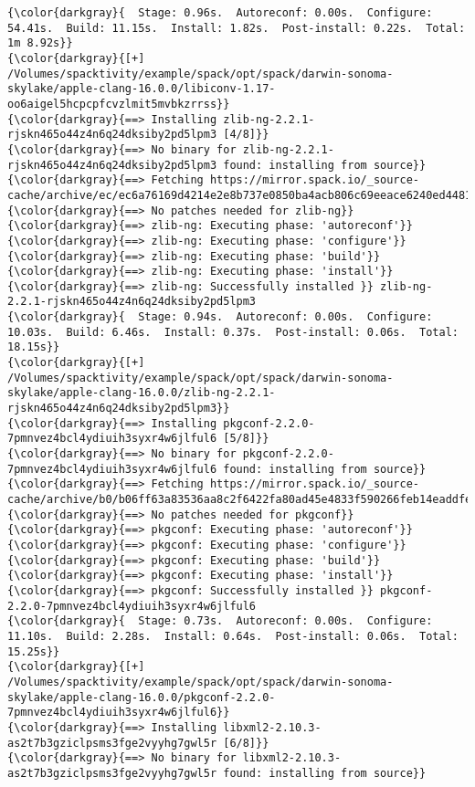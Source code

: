 \documentclass[10pt, oneside]{article}   	%
\begin{document}
{{\begin{Verbatim}[commandchars=\\\{\}]
{\color{darkgray}{  Stage: 0.96s.  Autoreconf: 0.00s.  Configure: 54.41s.  Build: 11.15s.  Install: 1.82s.  Post-install: 0.22s.  Total: 1m 8.92s}}
{\color{darkgray}{[+] /Volumes/spacktivity/example/spack/opt/spack/darwin-sonoma-skylake/apple-clang-16.0.0/libiconv-1.17-oo6aigel5hcpcpfcvzlmit5mvbkzrrss}}
{\color{darkgray}{==> Installing zlib-ng-2.2.1-rjskn465o44z4n6q24dksiby2pd5lpm3 [4/8]}}
{\color{darkgray}{==> No binary for zlib-ng-2.2.1-rjskn465o44z4n6q24dksiby2pd5lpm3 found: installing from source}}
{\color{darkgray}{==> Fetching https://mirror.spack.io/_source-cache/archive/ec/ec6a76169d4214e2e8b737e0850ba4acb806c69eeace6240ed4481b9f5c57cdf.tar.gz}}
{\color{darkgray}{==> No patches needed for zlib-ng}}
{\color{darkgray}{==> zlib-ng: Executing phase: 'autoreconf'}}
{\color{darkgray}{==> zlib-ng: Executing phase: 'configure'}}
{\color{darkgray}{==> zlib-ng: Executing phase: 'build'}}
{\color{darkgray}{==> zlib-ng: Executing phase: 'install'}}
{\color{darkgray}{==> zlib-ng: Successfully installed }} zlib-ng-2.2.1-rjskn465o44z4n6q24dksiby2pd5lpm3
{\color{darkgray}{  Stage: 0.94s.  Autoreconf: 0.00s.  Configure: 10.03s.  Build: 6.46s.  Install: 0.37s.  Post-install: 0.06s.  Total: 18.15s}}
{\color{darkgray}{[+] /Volumes/spacktivity/example/spack/opt/spack/darwin-sonoma-skylake/apple-clang-16.0.0/zlib-ng-2.2.1-rjskn465o44z4n6q24dksiby2pd5lpm3}}
{\color{darkgray}{==> Installing pkgconf-2.2.0-7pmnvez4bcl4ydiuih3syxr4w6jlful6 [5/8]}}
{\color{darkgray}{==> No binary for pkgconf-2.2.0-7pmnvez4bcl4ydiuih3syxr4w6jlful6 found: installing from source}}
{\color{darkgray}{==> Fetching https://mirror.spack.io/_source-cache/archive/b0/b06ff63a83536aa8c2f6422fa80ad45e4833f590266feb14eaddfe1d4c853c69.tar.xz}}
{\color{darkgray}{==> No patches needed for pkgconf}}
{\color{darkgray}{==> pkgconf: Executing phase: 'autoreconf'}}
{\color{darkgray}{==> pkgconf: Executing phase: 'configure'}}
{\color{darkgray}{==> pkgconf: Executing phase: 'build'}}
{\color{darkgray}{==> pkgconf: Executing phase: 'install'}}
{\color{darkgray}{==> pkgconf: Successfully installed }} pkgconf-2.2.0-7pmnvez4bcl4ydiuih3syxr4w6jlful6
{\color{darkgray}{  Stage: 0.73s.  Autoreconf: 0.00s.  Configure: 11.10s.  Build: 2.28s.  Install: 0.64s.  Post-install: 0.06s.  Total: 15.25s}}
{\color{darkgray}{[+] /Volumes/spacktivity/example/spack/opt/spack/darwin-sonoma-skylake/apple-clang-16.0.0/pkgconf-2.2.0-7pmnvez4bcl4ydiuih3syxr4w6jlful6}}
{\color{darkgray}{==> Installing libxml2-2.10.3-as2t7b3gziclpsms3fge2vyyhg7gwl5r [6/8]}}
{\color{darkgray}{==> No binary for libxml2-2.10.3-as2t7b3gziclpsms3fge2vyyhg7gwl5r found: installing from source}}

\end{Verbatim}}}
\end{document}
